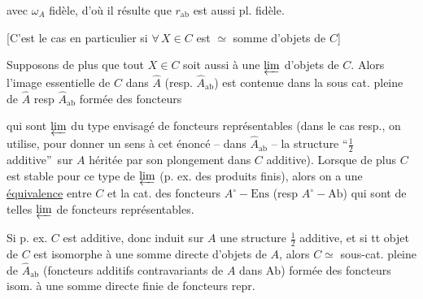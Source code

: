 avec $\omega_A$ fidèle, d'où il résulte que $r_{\mathrm{ab}}$ est aussi pl. fidèle.

[C'est le cas en particulier si $\forall\,X\in C$ est $\simeq$ somme d'objets de $C$]

Supposons de plus que tout $X\in C$ soit aussi  à une $\varprojlim$  d'objets de $C$. Alors l'image essentielle de $C$ dans $\widehat A$ (resp. $\widehat A_{\mathrm{ab}}$) est contenue dans la sous cat. pleine de $\widehat A$ resp $\widehat A_{\mathrm{ab}}$ formée des foncteurs


qui sont $\varprojlim$ du type envisagé de foncteurs représentables (dans le cas resp., on utilise, pour  donner un sens à cet énoncé -- dans $\widehat A_{\mathrm{ab}}$ -- la structure \textquotedblleft$\frac12$ additive\textquotedblright\ sur $A$ héritée par son plongement dans $C$ additive). Lorsque de plus $C$ est stable pour ce type de $\varprojlim$ (p. ex. des produits finis), alors on a  une \uline{équivalence} entre $C$ et la cat. des foncteurs $A^\circ\mathrel{-}\mathrm{Ens}$ (resp $A^\circ\mathrel{-}\mathrm{Ab}$) qui sont de telles $\varprojlim$ de foncteurs représentables.


Si p. ex. $C$ est additive, donc  induit sur $A$ une structure $\frac12$ additive, et si tt objet de $C$ est isomorphe à une somme directe  d'objets de $A$, alors $C\simeq$ sous-cat. pleine de $\widehat A_{\mathrm{ab}}$ (foncteurs additifs contravariants de $A$ dans $\mathrm{Ab}$) formée  des foncteurs isom. à une somme directe finie de foncteurs repr.


